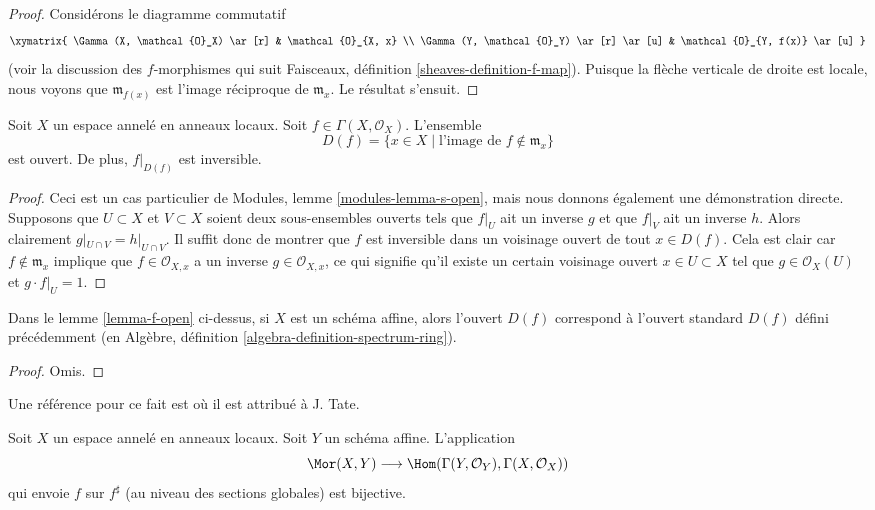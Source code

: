 \begin{proof}
Considérons le diagramme commutatif
$$
\xymatrix{
\Gamma(X, \mathcal{O}_X) \ar[r] &
\mathcal{O}_{X, x} \\
\Gamma(Y, \mathcal{O}_Y) \ar[r] \ar[u] &
\mathcal{O}_{Y, f(x)} \ar[u]
}
$$
(voir la discussion des $f$-morphismes qui
suit Faisceaux, définition \ref{sheaves-definition-f-map}).
Puisque la flèche verticale de droite est locale,
nous voyons que $\mathfrak m_{f(x)}$ est
l'image réciproque de $\mathfrak m_x$. Le résultat
s'ensuit.
\end{proof}

\begin{lemma}
\label{lemma-f-open}
Soit $X$ un espace annelé en anneaux locaux.
Soit $f \in \Gamma(X, \mathcal{O}_X)$.
L'ensemble
$$
D(f) = \{x \in X \mid \text{l'image de }f \not\in \mathfrak m_x\}
$$
est ouvert. De plus, $f|_{D(f)}$ est inversible.
\end{lemma}

\begin{proof}
Ceci est un cas particulier de Modules, lemme \ref{modules-lemma-s-open}, mais
nous donnons également une
démonstration directe. Supposons que $U \subset X$ et $V
\subset X$ soient deux sous-ensembles ouverts tels que
$f|_U$ ait un inverse $g$ et que $f|_V$ ait un inverse
$h$. Alors clairement $g|_{U\cap V} = h|_{U\cap
V}$. Il suffit donc de montrer que $f$ est inversible dans un
voisinage ouvert de tout $x \in D(f)$. Cela est
clair car $f \not \in \mathfrak m_x$ implique que $f \in \mathcal{O}_{X,
x}$ a un inverse $g \in \mathcal{O}_{X, x}$, ce qui signifie qu'il
existe un certain voisinage ouvert $x \in U \subset
X$ tel que $g \in \mathcal{O}_X(U)$ et $g\cdot f|_U = 1$.
\end{proof}

\begin{lemma}
\label{lemma-f-open-affine}
Dans le lemme \ref{lemma-f-open} ci-dessus, si $X$ est un schéma
affine, alors l'ouvert $D(f)$ correspond à l'ouvert standard
$D(f)$ défini précédemment
(en Algèbre, définition \ref{algebra-definition-spectrum-ring}).
\end{lemma}

\begin{proof}
Omis.
\end{proof}

\begin{lemma}
\label{lemma-morphism-into-affine}
\begin{reference}
Une référence pour ce fait est \cite[II, Err 1, Prop. 1.8.1]{EGA}
où il est attribué à J. Tate.
\end{reference}
Soit $X$ un espace annelé en anneaux locaux.
Soit $Y$ un schéma affine.
L'application
$$
\Mor(X, Y)
\longrightarrow
\Hom(\Gamma(Y, \mathcal{O}_Y), \Gamma(X, \mathcal{O}_X))
$$
qui envoie $f$ sur $f^\sharp$ (au niveau des sections globales) est bijective.
\end{lemma}

